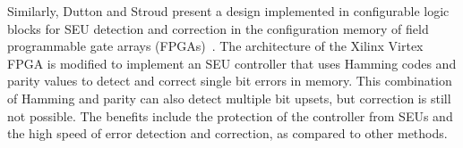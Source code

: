 Similarly, Dutton and Stroud present a design implemented in configurable logic blocks for SEU detection and correction in the configuration memory of field programmable gate arrays (FPGAs)~\cite{CATA09seuonVirtex}.
The architecture of the Xilinx Virtex FPGA is modified to implement an SEU controller that uses Hamming codes and parity values to detect and correct single bit errors in memory.
This combination of Hamming and parity can also detect multiple bit upsets, but correction is still not possible.
The benefits include the protection of the controller from SEUs and the high speed of error detection and correction, as compared to other methods.



